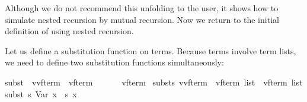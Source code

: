\begin{isabellebody}
\begin{isamarkuptext}
\noindent
Although we do not recommend this unfolding to the user, it shows how to
simulate nested recursion by mutual recursion.
Now we return to the initial definition of  using
nested recursion.

Let us define a substitution function on terms. Because terms involve term
lists, we need to define two substitution functions simultaneously:%
\end{isamarkuptext}%
\isamarkuptrue%
\isamarkupfalse%
\isanewline
subst\ {}{}\ {}{}{}v{}{}{}v{}{}f{}term{}\ {}\ {}{}v{}{}f{}term\ \ \ \ \ \ {}\ {}{}v{}{}f{}term{}\ \isanewline
substs{}{}\ {}{}{}v{}{}{}v{}{}f{}term{}\ {}\ {}{}v{}{}f{}term\ list\ {}\ {}{}v{}{}f{}term\ list{}\isanewline
{}\isanewline
{}subst\ s\ {}Var\ x{}\ {}\ s\ x{}\ {}\isanewline

\end{isabellebody}
